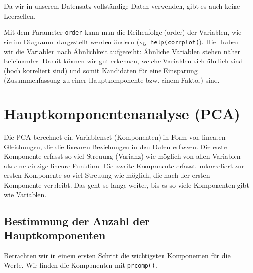 \documentclass[12pt,ngerman,]{book}
\makeatletter
\newenvironment{Shaded}{\begin{snugshade}}{\end{snugshade}}
\newcommand{\KeywordTok}[1]{\textcolor[rgb]{0.13,0.29,0.53}{\textbf{#1}}}
\newcommand{\StringTok}[1]{\textcolor[rgb]{0.31,0.60,0.02}{#1}}
\newcommand{\CommentTok}[1]{\textcolor[rgb]{0.56,0.35,0.01}{\textit{#1}}}
\newcommand{\NormalTok}[1]{#1}
\newenvironment{kframe}{%
\medskip{}
\setlength{\fboxsep}{.8em}
 \def\at@end@of@kframe{}%
 \ifinner\ifhmode%
  \def\at@end@of@kframe{\end{minipage}}%
  \begin{minipage}{\columnwidth}%
 \fi\fi%
 \def\FrameCommand##1{\hskip\@totalleftmargin \hskip-\fboxsep
 \colorbox{shadecolor}{##1}\hskip-\fboxsep
     \hskip-\linewidth \hskip-\@totalleftmargin \hskip\columnwidth}%
 \MakeFramed {\advance\hsize-\width
   \@totalleftmargin\z@ \linewidth\hsize
   \@setminipage}}%
 {\par\unskip\endMakeFramed%
 \at@end@of@kframe}
\renewenvironment{Shaded}{\begin{kframe}}{\end{kframe}}
\theoremstyle{definition}
\theoremstyle{definition}
\theoremstyle{remark}
\makeatother
\begin{document}
Da wir in unserem Datensatz vollständige Daten verwenden, gibt es auch
keine Leerzellen.

Mit dem Parameter \texttt{order} kann man die Reihenfolge (order) der
Variablen, wie sie im Diagramm dargestellt werden ändern (vgl
\texttt{help(corrplot)}). Hier haben wir die Variablen nach Ähnlichkeit
aufgereiht: Ähnliche Variablen stehen näher beieinander. Damit können
wir gut erkennen, welche Variablen sich ähnlich sind (hoch korreliert
sind) und somit Kandidaten für eine Einsparung (Zusammenfassung zu einer
Hauptkomponente bzw. einem Faktor) sind.

\section{Hauptkomponentenanalyse
(PCA)}\label{hauptkomponentenanalyse-pca}

Die PCA berechnet ein Variablenset (Komponenten) in Form von linearen
Gleichungen, die die linearen Beziehungen in den Daten erfassen. Die
erste Komponente erfasst so viel Streuung (Varianz) wie möglich von
allen Variablen als eine einzige lineare Funktion. Die zweite Komponente
erfasst unkorreliert zur ersten Komponente so viel Streuung wie möglich,
die nach der ersten Komponente verbleibt. Das geht so lange weiter, bis
es so viele Komponenten gibt wie Variablen.

\subsection{Bestimmung der Anzahl der
Hauptkomponenten}\label{bestimmung-der-anzahl-der-hauptkomponenten}

Betrachten wir in einem ersten Schritt die wichtigsten Komponenten für
die Werte. Wir finden die Komponenten mit \texttt{prcomp()}.

\begin{Shaded}
\end{Shaded}
\end{document}
